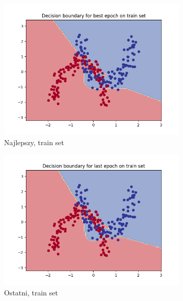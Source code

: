 \documentclass[12pt]{article}
\newcommand*{\subfigwidth}{0.24\textwidth}
\begin{document}
\begin{figure}[H]
\begin{subfigure}[t]{\subfigwidth}
        \includegraphics[width=\linewidth]{img/exp_4/set_0.8/best/train_boundary.png}
        \caption{Najlepszy, train set}
    \end{subfigure}
    \hfill
    \begin{subfigure}[t]{\subfigwidth}
        \includegraphics[width=\linewidth]{img/exp_4/set_0.8/last/train_boundary.png}
        \caption{Ostatni, train set}
    \end{subfigure}
    \\
    \hspace{\subfigwidth}
    \hfill
    \begin{subfigure}[t]{\subfigwidth}

\end{subfigure}
\end{figure}
\end{document}
